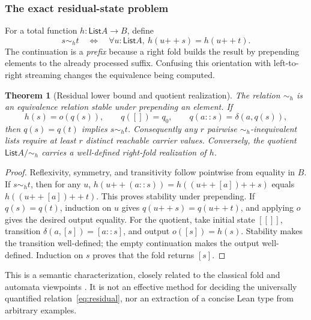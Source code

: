 \documentclass[11pt,a4paper]{article}
\newtheorem{theorem}{Theorem}[section]
\theoremstyle{definition}
\theoremstyle{remark}
\newcommand{\List}{\mathsf{List}}
\newcommand{\cat}{\mathbin{+\!+}}
\begin{document}
\subsubsection*{The exact residual-state problem}
For a total function $h:\List A\to B$, define
\[
 s\sim_h t\quad\Longleftrightarrow\quad
 \forall u:\List A,\ h(u\cat s)=h(u\cat t).
 \tag{3}\label{eq:residual}
\]
The continuation is a \emph{prefix} because a right fold builds the result by
prepending elements to the already processed suffix. Confusing this orientation
with left-to-right streaming changes the equivalence being computed.

\begin{theorem}[Residual lower bound and quotient realization]
The relation $\sim_h$ is an equivalence relation stable under prepending an
element. If
\[
 h(s)=o(q(s)),\qquad q([])=q_0,\qquad q(a::s)=\delta(a,q(s)),
 \tag{4}\label{eq:realization}
\]
then $q(s)=q(t)$ implies $s\sim_h t$. Consequently any $r$ pairwise
$\sim_h$-inequivalent lists require at least $r$ distinct reachable carrier
values. Conversely, the quotient $\List A/{\sim_h}$ carries a well-defined
right-fold realization of $h$.
\end{theorem}
\begin{proof}
Reflexivity, symmetry, and transitivity follow pointwise from equality in $B$.
If $s\sim_h t$, then for any $u$,
$h(u\cat(a::s))=h((u\cat[a])\cat s)$ equals
$h((u\cat[a])\cat t)$. This proves stability under prepending.
If $q(s)=q(t)$, induction on $u$ gives
$q(u\cat s)=q(u\cat t)$, and applying $o$ gives the desired output equality.
For the quotient, take initial state $[[]]$, transition
$\delta(a,[s])=[a::s]$, and output $o([s])=h(s)$. Stability makes the transition
well-defined; the empty continuation makes the output well-defined. Induction
on $s$ proves that the fold returns $[s]$.
\end{proof}

This is a semantic characterization, closely related to the classical fold
and automata viewpoints \cite{whenfold,angluin}. It is not an effective method
for deciding the universally quantified relation~\eqref{eq:residual}, nor an
extraction of a concise Lean type from arbitrary examples.
\end{document}
